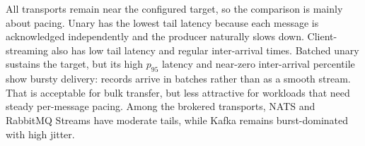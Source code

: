 \begin{table}[t]
    \centering
    \scriptsize
    \caption{Continuous steady-rate scenario: single-node results averaged over ten repetitions (1\,KiB payload, 1{,}000 msg/s target). Throughput in msg/s; latency, inter-arrival, and jitter values in milliseconds.}
    \label{tab:grpc-continuous-results}
    \setlength{\tabcolsep}{3pt}
\end{table}

All transports remain near the configured target, so the comparison is mainly about pacing. Unary has the lowest tail latency because each message is acknowledged independently and the producer naturally slows down. Client-streaming also has low tail latency and regular inter-arrival times. Batched unary sustains the target, but its high $p_{95}$ latency and near-zero inter-arrival percentile show bursty delivery: records arrive in batches rather than as a smooth stream. That is acceptable for bulk transfer, but less attractive for workloads that need steady per-message pacing. Among the brokered transports, NATS and RabbitMQ Streams have moderate tails, while Kafka remains burst-dominated with high jitter.

